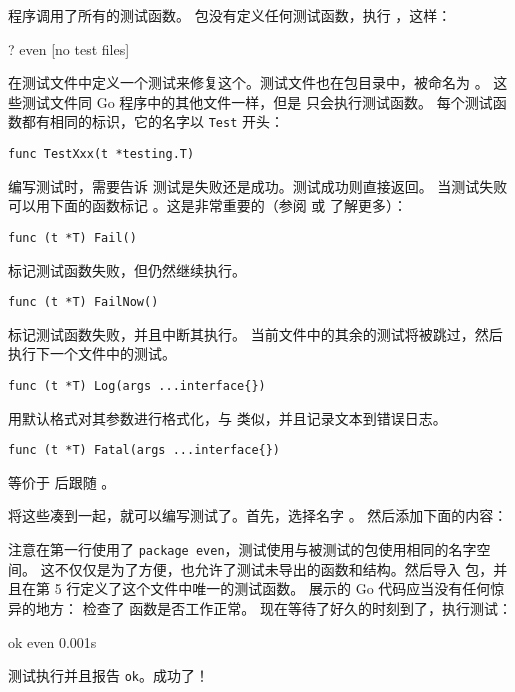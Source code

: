  程序调用了所有的测试函数。
 包没有定义任何测试函数，执行 ，这样：
\begin{display}
\pr {}
?       even    [no test files]
\end{display}
在测试文件中定义一个测试来修复这个。测试文件也在包目录中，被命名为 。
这些测试文件同 Go 程序中的其他文件一样，但是  只会执行测试函数。
每个测试函数都有相同的标识，它的名字以 \lstinline{Test} 开头：
\begin{lstlisting}
func TestXxx(t *testing.T)
\end{lstlisting}

编写测试时，需要告诉  测试是失败还是成功。测试成功则直接返回。
当测试失败可以用下面的函数标记 \cite{go_doc}。这是非常重要的（参阅  或
 了解更多）：

\begin{lstlisting}[numbers=none]
func (t *T) Fail()
\end{lstlisting}
 标记测试函数失败，但仍然继续执行。

\begin{lstlisting}[numbers=none]
func (t *T) FailNow()
\end{lstlisting}
 标记测试函数失败，并且中断其执行。
当前文件中的其余的测试将被跳过，然后执行下一个文件中的测试。

\begin{lstlisting}[numbers=none]
func (t *T) Log(args ...interface{})
\end{lstlisting}
 用默认格式对其参数进行格式化，与
 类似，并且记录文本到错误日志。

\begin{lstlisting}[numbers=none]
func (t *T) Fatal(args ...interface{})
\end{lstlisting}
 等价于  后跟随 。

将这些凑到一起，就可以编写测试了。首先，选择名字 。
然后添加下面的内容：


注意在第一行使用了 \lstinline{package even}，测试使用与被测试的包使用相同的名字空间。
这不仅仅是为了方便，也允许了测试未导出的函数和结构。然后导入
 包，并且在第 5 行定义了这个文件中唯一的测试函数。
展示的 Go 代码应当没有任何惊异的地方：
检查了  函数是否工作正常。
现在等待了好久的时刻到了，执行测试：
\begin{display}
\pr {}
ok      even    0.001s
\end{display}
\noindent{}测试执行并且报告 \texttt{ok}。成功了！

